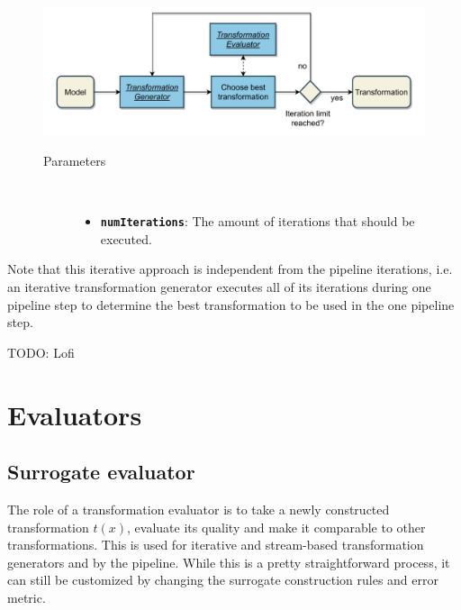 \documentclass[
  a4paper,  %
  twoside,  %
  bibliography=totoc,
  headsepline,
  cleardoublepage=empty,
  parskip=half,
  draft=false
]{scrbook}
\begin{document}
\begin{mdframed}[style=style,frametitle={Transformation generator (iterative)}]
\begin{figure}[H]
	\includegraphics[width=\textwidth]{graphics/TransformationGen_Iterative.pdf}

\delimit

\begin{description}
\item[Parameters] {~ \begin{itemize}[\null]
\item \texttt{\textbf{numIterations}}: The amount of iterations that should be executed.
\end{itemize}}
\end{description}

\delimit
{}
\label{fig:itg}
\end{figure}
\end{mdframed}


Note that this iterative approach is independent from the pipeline iterations, i.e. an iterative transformation generator executes all of its iterations during one pipeline step to determine the best transformation to be used in the one pipeline step.

TODO: Lofi

\newpage
\section {Evaluators}

\subsection {Surrogate evaluator}
\label{sec:se}

The role of a transformation evaluator is to take a newly constructed transformation $t(x)$, evaluate its quality and make it comparable to other transformations.
This is used for iterative and stream-based transformation generators and by the pipeline.
While this is a pretty straightforward process, it can still be customized by changing the surrogate construction rules and error metric.
\end{document}
